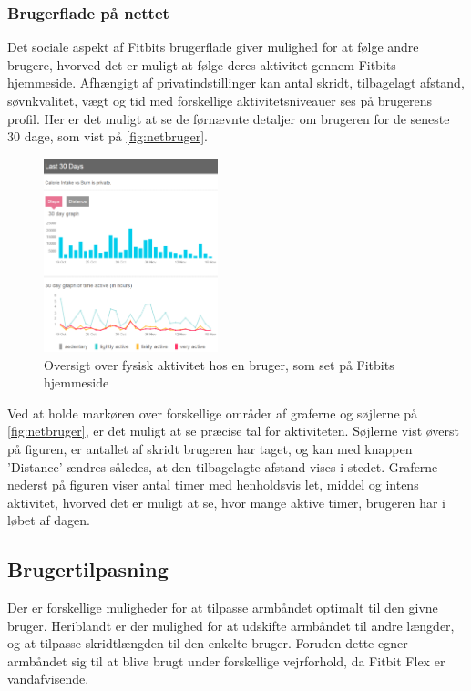 \subsubsection{Brugerflade på nettet}

Det sociale aspekt af Fitbits brugerflade giver mulighed for at følge andre brugere, hvorved det er muligt at følge deres aktivitet gennem Fitbits hjemmeside. Afhængigt af privatindstillinger kan antal skridt, tilbagelagt afstand, søvnkvalitet, vægt og tid med forskellige aktivitetsniveauer ses på brugerens profil. Her er det muligt at se de førnævnte detaljer om brugeren for de seneste $30$ dage, som vist på \autoref{fig:netbruger}.

\begin{figure}[H]
	\centering
	\includegraphics[width=0.45\textwidth]{figures/Netbruger}
	\caption{Oversigt over fysisk aktivitet hos en bruger, som set på Fitbits hjemmeside}
	\label{fig:netbruger}
\end{figure}

\noindent
Ved at holde markøren over forskellige områder af graferne og søjlerne på \autoref{fig:netbruger}, er det muligt at se præcise tal for aktiviteten. Søjlerne vist øverst på figuren, er antallet af skridt brugeren har taget, og kan med knappen 'Distance' ændres således, at den tilbagelagte afstand vises i stedet. Graferne nederst på figuren viser antal timer med henholdsvis let, middel og intens aktivitet, hvorved det er muligt at se, hvor mange aktive timer, brugeren har i løbet af dagen. 

\subsection{Brugertilpasning} \label{sec:brugertilpasning}
Der er forskellige muligheder for at tilpasse armbåndet optimalt til den givne bruger. Heriblandt er der mulighed for at udskifte armbåndet til andre længder, og at tilpasse skridtlængden til den enkelte bruger. Foruden dette egner armbåndet sig til at blive brugt under forskellige vejrforhold, da Fitbit Flex er vandafvisende. 

